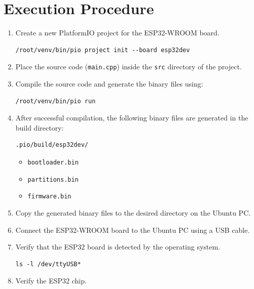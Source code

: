 \documentclass[12pt,a4paper]{article}
\begin{document}
\section*{Execution Procedure}

\begin{enumerate}

\item Create a new PlatformIO project for the ESP32-WROOM board.

\begin{verbatim}
/root/venv/bin/pio project init --board esp32dev
\end{verbatim}

\item Place the source code (\texttt{main.cpp}) inside the \texttt{src} directory of the project.

\item Compile the source code and generate the binary files using:

\begin{verbatim}
/root/venv/bin/pio run
\end{verbatim}

\item After successful compilation, the following binary files are generated in the build directory:

\begin{verbatim}
.pio/build/esp32dev/
\end{verbatim}

\begin{itemize}
    \item \texttt{bootloader.bin}
    \item \texttt{partitions.bin}
    \item \texttt{firmware.bin}
\end{itemize}

\item Copy the generated binary files to the desired directory on the Ubuntu PC.

\item Connect the ESP32-WROOM board to the Ubuntu PC using a USB cable.

\item Verify that the ESP32 board is detected by the operating system.

\begin{verbatim}
ls -l /dev/ttyUSB*
\end{verbatim}

\item Verify the ESP32 chip.


\end{enumerate}
\end{document}

